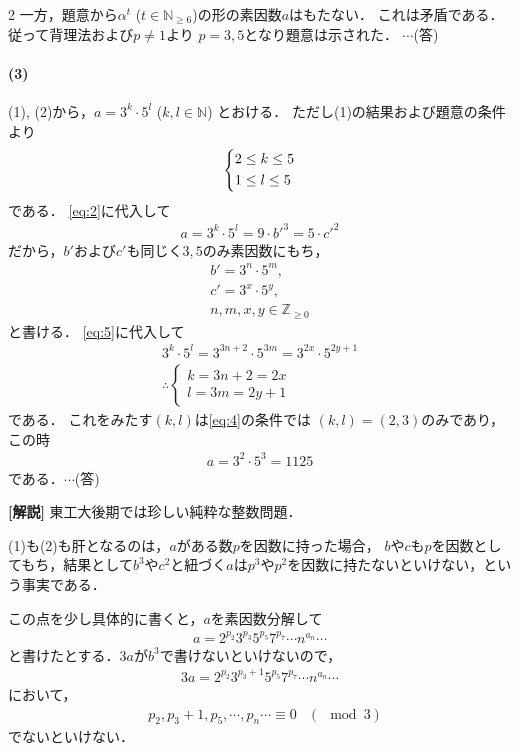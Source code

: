 \documentclass[../../main.tex]{subfiles}
\begin{document}
\begin{multicols}{2}
  一方，題意から$\alpha^t$ ($t \in \mathbb{N}_{\ge 6}$)の形の素因数$a$はもたない．
  これは矛盾である．従って背理法および$p\neq 1$より $p=3,5$となり題意は示された． $\cdots$(答)

  \paragraph{(3)}
  (1), (2)から，$a=3^k \cdot 5^l$ ($k,l \in \mathbb{N}$) とおける．
  ただし(1)の結果および題意の条件より
  \begin{align}
    \begin{dcases}
      2 \le k \le 5 \\
      1 \le l \le 5
    \end{dcases} \label{eq:4}
  \end{align}
  である．
  \cref{eq:2}に代入して
  \begin{align}
    a = 3^k \cdot 5^l = 9 \cdot b'^3 = 5 \cdot c'^2\label{eq:5}
  \end{align}
  だから，$b'$および$c'$も同じく$3,5$のみ素因数にもち，
  \begin{align}
    b'=3^n \cdot 5^m, \\
    c'=3^x \cdot 5^y, \\
    n,m,x,y \in \mathbb{Z}_{\ge 0}
  \end{align}
  と書ける．
  \cref{eq:5}に代入して
  \begin{align}
    3^k \cdot 5^l = 3^{3n+2} \cdot 5^{3m} = 3^{2x} \cdot 5^{2y+1} \\
    \therefore
    \begin{cases}
      k=3n+2=2x \\
      l=3m=2y+1
    \end{cases}
  \end{align}
  である．
  これをみたす$(k,l)$は\cref{eq:4}の条件では
  $(k,l)=(2,3)$のみであり，この時
  \begin{align}
    a=3^2 \cdot 5^3 = 1125
  \end{align}
  である．$\cdots$(答)

  {\bf [解説]}
  東工大後期では珍しい純粋な整数問題．

  (1)も(2)も肝となるのは，$a$がある数$p$を因数に持った場合，
  $b$や$c$も$p$を因数としてもち，結果として$b^3$や$c^2$と紐づく$a$は$p^3$や$p^2$を因数に持たないといけない，という事実である．

  この点を少し具体的に書くと，$a$を素因数分解して
  \begin{align}
    a = 2^{p_2}3^{p_3}5^{p_5}7^{p_7}\cdots n^{a_n} \cdots
  \end{align}
  と書けたとする．$3a$が$b^3$で書けないといけないので，
  \begin{align}
    3a = 2^{p_2}3^{p_3+1}5^{p_5}7^{p_7}\cdots n^{a_n} \cdots
  \end{align}
  において，
  \begin{align}
    & p_2, p_3+1, p_5,\cdots, p_n \cdots \equiv 0 & (\mod 3) \label{eq:6}
  \end{align}
  でないといけない．


\end{multicols}
\end{document}
